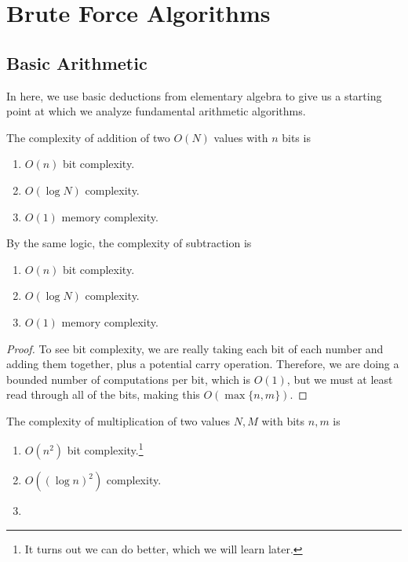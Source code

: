 \section{Brute Force Algorithms} 

\subsection{Basic Arithmetic}

  In here, we use basic deductions from elementary algebra to give us a starting point at which we analyze fundamental arithmetic algorithms. 

  \begin{theorem}
    The complexity of addition of two $O(N)$ values with $n$ bits is
    \begin{enumerate}
      \item $O(n)$ bit complexity. 
      \item $O(\log N)$ complexity. 
      \item $O(1)$ memory complexity. 
    \end{enumerate}
    By the same logic, the complexity of subtraction is 
    \begin{enumerate}
      \item $O(n)$ bit complexity. 
      \item $O(\log N)$ complexity. 
      \item $O(1)$ memory complexity. 
    \end{enumerate}
  \end{theorem}
  \begin{proof}
    To see bit complexity, we are really taking each bit of each number and adding them together, plus a potential carry operation. Therefore, we are doing a bounded number of computations per bit, which is $O(1)$, but we must at least read through all of the bits, making this $O(\max\{n, m\})$. 
  \end{proof}

  \begin{theorem}
    The complexity of multiplication of two values $N, M$ with bits $n, m$ is 
    \begin{enumerate}
      \item $O(n^2)$ bit complexity.\footnote{It turns out we can do better, which we will learn later.} 
      \item $O((\log n)^2)$ complexity. 
      \item 
    \end{enumerate}
  \end{theorem}

